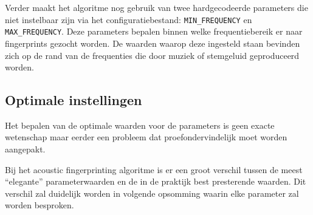 Verder maakt het algoritme nog gebruik van twee hardgecodeerde parameters die niet instelbaar zijn via het configuratiebestand: \texttt{MIN\_FREQUENCY} en \texttt{MAX\_FREQUENCY}. Deze parameters bepalen binnen welke frequentiebereik er naar fingerprints gezocht worden. De waarden waarop deze ingesteld staan bevinden zich op de rand van de frequenties die door muziek of stemgeluid geproduceerd worden.

\subsection{Optimale instellingen}
\label{optimal-acoustic-fingerprinting}

Het bepalen van de optimale waarden voor de parameters is geen exacte wetenschap maar eerder een probleem dat proefondervindelijk moet worden aangepakt.

Bij het acoustic fingerprinting algoritme is er een groot verschil tussen de meest ``elegante'' parameterwaarden en de in de praktijk best presterende waarden. Dit verschil zal duidelijk worden in volgende opsomming waarin elke parameter zal worden besproken.


